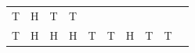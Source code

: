 {\begin{tabular}[t]{|l|l|l|l|l|l|l|l|l|l|}
        T &
        H &
        T &
        T%
     \tabularnewline\cline{1-1}\cline{2-2}\cline{3-3}\cline{4-4}\cline{5-5}\cline{6-6}\cline{7-7}\cline{8-8}\cline{9-9}\cline{10-10}
        T &
        H &
        H &
        H &
        T &
        T &
        H &
        T &
        T &

\end{tabular}}

